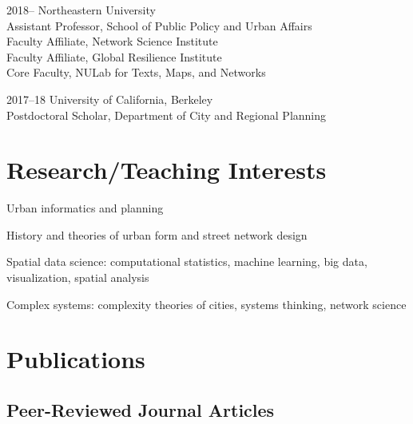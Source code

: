 \documentclass[12pt,letterpaper]{report}
\newcommand{\listitemspace}{0.15em}
\renewenvironment{itemize}
{\begin{list}{}{\setlength{\leftmargin}{0em}
			\setlength{\parskip}{0em}
			\setlength{\itemsep}{\listitemspace}
			\setlength{\parsep}{\listitemspace}}}
	{\end{list}}
\begin{document}
	\begin{tablist}                     
		
		\item[2018--]   \tab Northeastern University \\
		Assistant Professor, School of Public Policy and Urban Affairs \\
		Faculty Affiliate, Network Science Institute \\
		Faculty Affiliate, Global Resilience Institute \\
		Core Faculty, NULab for Texts, Maps, and Networks
		
		
		\item[2017--18] \tab University of California, Berkeley \\
		Postdoctoral Scholar, Department of City and Regional Planning
		
		
	\end{tablist}
	
	
	
	\section*{Research/Teaching Interests}
	
	\begin{itemize}
		
		\item Urban informatics and planning
		
		\item History and theories of urban form and street network design
		
		\item Spatial data science: computational statistics, machine learning, big data, visualization, spatial analysis
		
		\item Complex systems: complexity theories of cities, systems thinking, network science
		
	\end{itemize}
	
	
	
	\section*{Publications}
	
	\subsection*{Peer-Reviewed Journal Articles}
	
\end{document}
